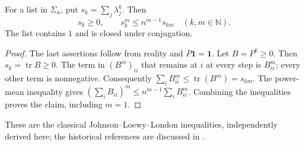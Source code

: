 \begin{lemma}
\label{lem:jll}
For a list in \(\Sigma_n\), put \(s_k=\sum_j\lambda_j^k\).
Then
\[
 s_k\geq0,\qquad s_k^m\leq n^{m-1}s_{km}
 \quad(k,m\in\mathbb N).
\]
The list contains \(1\) and is closed under conjugation.
\end{lemma}
\begin{proof}
The last assertions follow from reality and \(P\mathbf1=\mathbf1\).
Let \(B=P^k\geq0\). Then \(s_k=\operatorname{tr}B\geq0\).
The term in \((B^m)_{ii}\) that remains at \(i\) at every step is
\(B_{ii}^m\); every other term is nonnegative. Consequently
\(\sum_iB_{ii}^m\leq\operatorname{tr}(B^m)=s_{km}\).
The power-mean inequality gives
\((\sum_iB_{ii})^m\leq n^{m-1}\sum_iB_{ii}^m\).
Combining the inequalities proves the claim, including \(m=1\).
\end{proof}
These are the classical Johnson--Loewy--London inequalities, independently
derived here; the historical references are discussed in
\citet[Section~1.1]{croninlaffey2018diagonalizable}.

